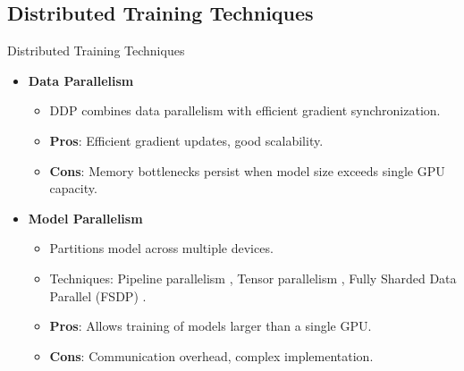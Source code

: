 \documentclass{beamer}
\begin{document}
\subsection{Distributed Training Techniques}

\begin{frame}{Distributed Training Techniques}
    \begin{itemize}
        \item \textbf{Data Parallelism}
            \begin{itemize}
                \item DDP combines data parallelism with efficient gradient synchronization.
                \item \textbf{Pros}: Efficient gradient updates, good scalability.
                \item \textbf{Cons}: Memory bottlenecks persist when model size exceeds single GPU capacity.
            \end{itemize}
        \item \textbf{Model Parallelism}
            \begin{itemize}
                \item Partitions model across multiple devices.
                \item Techniques: Pipeline parallelism \citep{huangGPipeEfficientTraining2019}, Tensor parallelism \citep{shoeybiMegatronLMTuningScaling2019}, Fully Sharded Data Parallel (FSDP) \citep{zhaoExtendingTorchElasticStateful2020}.
                \item \textbf{Pros}: Allows training of models larger than a single GPU.
                \item \textbf{Cons}: Communication overhead, complex implementation.
            \end{itemize}
    \end{itemize}
\end{frame}
\end{document}
